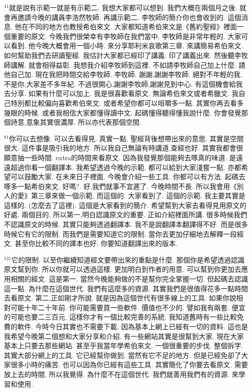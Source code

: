 \documentclass{book}
\begin{document}
$^{41}$就是說有示範一就是有示範二.
我想大家都可以想到.
我們大概在兩個月之後.
就會再邀請今晚的講員李浩然牧師.
再講示範二.
李牧師的簡介你也會收到的.
這個消息.
他在不同的地方也教授希伯來文.
大家都知道希伯來文是《舊約聖經》裡面一個重要的原文.
今晚我們很榮幸有李牧師在我們當中.
李牧師是非常年輕的.
大家可以看到.
他今晚大概會用一個小時.
來分享耶利米哀歌第三章.
來講簡易希伯來文.
如何幫助我們去研讀聖經.
我估計大家都已經印了講義.
印了講義出來.
然後聽李牧師講解.
就會相得益彰.
我想我介紹李牧師到這裡.
不如請李牧師自己加上什麼.
請他自己加.
現在我把時間交給李牧師.
李牧師.
謝謝,謝謝李牧師.
絕對不年輕的我.
不是你,大家差不多年紀.
不過很開心,謝謝李牧師,謝謝見到中心.
有這個機會給我去分享.
如果有什麼可以加上.
我是很喜歡看原文.
無論希伯來文或者希臘文.
我自己特別都比較偏向喜歡希伯來文.
或者希望你都可以咀嚼多一點.
其實你再去看多幾眼的時候.
或者我相信大家都懂得讀中文.
起碼懂得聽得懂我說什麼.
你會發覺那個詩意,意象其實很濃厚.
所以亦代表那個空間.

$^{81}$你可以去想像.
可以去看得見.
真實一點.
聖經背後想帶出來的意思.
其實是空間很大.
這件事是吸引我的地方.
所以我自己無論有時講道,查經也好.
其實我都會很願意抽一些時間.
extra的時間來看原文.
因為我發覺那個能夠去啄真的味道.
是遠遠超過你看一個翻譯本.
我希望透過今晚的示範.
都可以給到大家淺嘗一點.
亦都希望可以鼓勵大家.
在未來日子裡面.
今晚會介紹一些工具.
你都可以有方法.
起碼去啄多一點希伯來文.
好嗎?.
好,我們就事不宜遲了.
今晚時間不長.
所以我會用《別人的愛》第三章來做一個示範.
而這個的.
大家看到了.
這個的示範.
我主要其實是這樣的.
(怎麼去了這裡).
這個是大家看到的簡介.
希望幫到大家去看得見用原文的好處.
兩個目的.
所以第一,明白認識原文的重要.
正如介紹裡面所講.
很多時候我們不認識原文的時候.
其實只能夠透過翻譯本.
我不是說翻譯本翻譯得不好.
而是很多時候它有它的限制.
而我們是需要知道它的限制.
當你去更加仔細地去解釋一段經文.
甚至你比較不同的譯本也好.
你要知道翻譯出來的版本.

$^{121}$它的限制.
以至你繼續知道經文要帶出來的重點是什麼.
那個你是希望透過認識原文幫到你.
所以你就可以透過這樣.
更加明白到作者的用意.
可以幫到你更加去應用相關的經文.
這是第一.
當然今晚能夠做的不是幫你完全掌握一切.
但起碼去認識這一點.
為什麼在這個世代.
我們有這麼多的資源.
其實我們是很值得花多一點時間去看原文.
第二,正如剛才所說.
就是因為這個世代有很多線上的工具.
如果你說相對可能十年二十年前.
你可能需要買一些軟件.
價值也不少的.
譬如我有兩套.
便宜的可能也要二三百元.
這樣你才有一個比較完善的系統.
我知道舊時有一些比較免費的軟件.
今時今日其實也不需要下載.
因為基本上網上已經有一切的資料.
這也是我希望今晚第二個想和大家分享和介紹.
有一些網站其實是很幫到大家.
現在大家基本上只要去那些網站.
甚至乎我當年學希伯來文.
一個很重要的步伐.
整個拆字.
其實大部分網上的工具.
它已經幫你做到.
當然有它不足的地方.
但是已經免卻了大家很多小時的痛苦.
也可以因為你已經有這些工具.
其實簡化了你要去看原文.
需要放上去的時間.
所以我覺得.
為什麼不在這個世代.
我們就善用我們有的資源.
來學習和使用.
\end{document}

